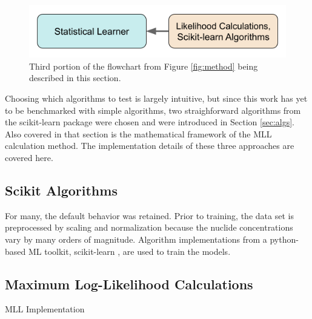 
\begin{figure}[H]
  \centering
  \includegraphics[width=0.7\linewidth]{./chapters/method/methodology3.png}
  \caption{Third portion of the flowchart from Figure \ref{fig:method} being 
           described in this section.}
\end{figure}

Choosing which algorithms to test is largely intuitive, but since this work has
yet to be benchmarked with simple algorithms, two straighforward algorithms
from the scikit-learn package \cite{scikit} were chosen and were introduced in
Section \ref{sec:algs}. Also covered in that section is the mathematical
framework of the \gls{MLL} calculation method. The implementation details of
these three approaches are covered here. 

\subsection{Scikit Algorithms}
\label{sec:scikit}

For many, the default behavior was retained. Prior to training, the data set is
preprocessed by scaling and normalization because the nuclide concentrations
vary by many orders of magnitude. Algorithm implementations from a python-based
\gls{ML} toolkit, scikit-learn \cite{scikit}, are used to train the models.

\subsection{Maximum Log-Likelihood Calculations}
\label{sec:mll}

\gls{MLL} Implementation
